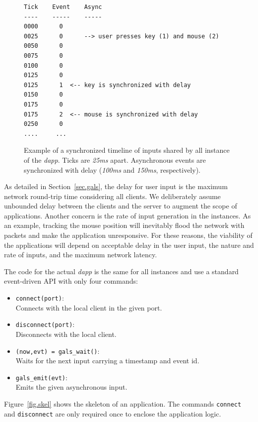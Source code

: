 \documentclass[sigplan,screen]{acmart}
\begin{document}
\begin{figure}[t]
{\scriptsize
\begin{verbatim}
Tick    Event    Async
----    -----    -----
0000      0
0025      0      --> user presses key (1) and mouse (2)
0050      0
0075      0
0100      0
0125      0
0125      1  <-- key is synchronized with delay
0150      0
0175      0
0175      2  <-- mouse is synchronized with delay
0250      0
....     ...
\end{verbatim}
}
  \caption{
    \label{fig.timeline}
    Example of a synchronized timeline of inputs shared by all instance of the
    \emph{dapp}.
    Ticks are \emph{25ms} apart.
    Asynchronous events are synchronized with delay (\emph{100ms} and
    \emph{150ms}, respectively).
  }
\end{figure}

As detailed in Section~\ref{sec.gals}, the delay for user input is the maximum
network round-trip time considering all clients.
We deliberately assume unbounded delay between the clients and the server to
augment the scope of applications.
Another concern is the rate of input generation in the instances.
As an example, tracking the mouse position will inevitably flood the network
with packets and make the application unresponsive.
For these reasons, the viability of the applications will depend on acceptable
delay in the user input, the nature and rate of inputs, and the maximum network
latency.

The code for the actual \emph{dapp} is the same for all instances and use a
standard event-driven API with only four commands:
\begin{itemize}
\item \texttt{connect(port)}:            \\Connects with the local client in the given port.
\item \texttt{disconnect(port)}:         \\Disconnects with the local client.
\item \texttt{(now,evt) = gals\_wait()}: \\Waits for the next input carrying a timestamp and event id.
\item \texttt{gals\_emit(evt)}:          \\Emits the given asynchronous input.
\end{itemize}
Figure~\ref{fig.skel} shows the skeleton of an application.
The commands \texttt{connect} and \texttt{disconnect} are only required once to
enclose the application logic.
\end{document}
